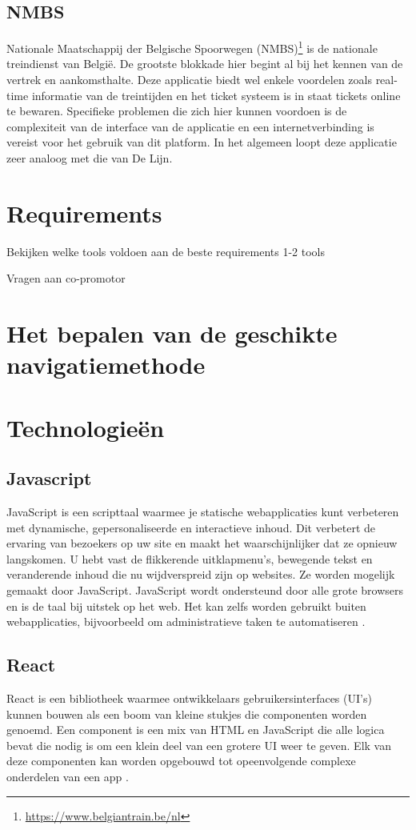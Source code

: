 \subsection{NMBS}
\label{sec:nmbs}
Nationale Maatschappij der Belgische Spoorwegen (NMBS)\footnote{\url{https://www.belgiantrain.be/nl}} is de nationale treindienst van België. De grootste blokkade hier begint al bij het kennen van de vertrek en aankomsthalte. Deze applicatie biedt wel enkele voordelen zoals real-time informatie van de treintijden en het ticket systeem is in staat tickets online te bewaren. Specifieke problemen die zich hier kunnen voordoen is de complexiteit van de interface van de applicatie en een internetverbinding is vereist voor het gebruik van dit platform. In het algemeen loopt deze applicatie zeer analoog met die van De Lijn.
\section{Requirements}
\label{sec:requirements}
Bekijken welke tools voldoen aan de beste requirements 1-2 tools

Vragen aan co-promotor
\section{Het bepalen van de geschikte navigatiemethode}
\label{sec:het bepalen van de geschikte navigatiemethode}
\section{Technologieën}
\label{sec:technologieën}
\subsection{Javascript}
\label{sec:javascript}
JavaScript is een scripttaal waarmee je statische webapplicaties kunt verbeteren met
dynamische, gepersonaliseerde en interactieve inhoud. Dit verbetert de ervaring van bezoekers op uw site en
maakt het waarschijnlijker dat ze opnieuw langskomen. U hebt vast de flikkerende uitklapmenu's, bewegende
tekst en veranderende inhoud die nu wijdverspreid zijn op websites. Ze worden mogelijk gemaakt door JavaScript. JavaScript wordt ondersteund door alle grote browsers en is de taal bij uitstek op het web. Het kan zelfs worden gebruikt buiten webapplicaties, bijvoorbeeld om administratieve taken te automatiseren \autocite{Wilton2004}.
\subsection{React}
\label{sec:react}
React is een bibliotheek waarmee ontwikkelaars gebruikersinterfaces (UI's) kunnen bouwen als een boom van kleine stukjes die componenten worden genoemd. Een component is een mix van HTML en JavaScript die alle logica bevat die nodig is om een klein deel van een grotere UI weer te geven. Elk van deze componenten kan worden opgebouwd tot opeenvolgende complexe onderdelen van een app \autocite{Baer2018}.
